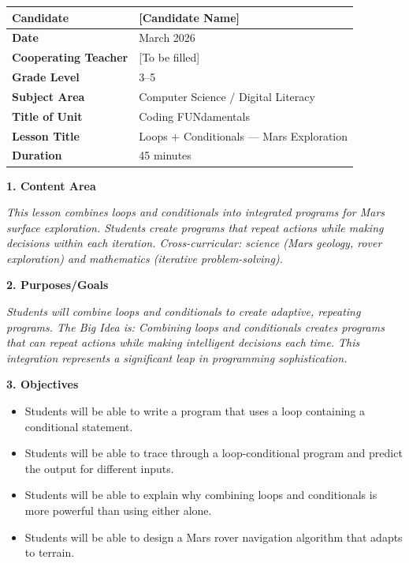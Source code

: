 \documentclass[11pt,letterpaper]{article}
\begin{document}
\begin{longtable}{|L{0.28\textwidth}|L{0.65\textwidth}|}
\hline
\textbf{Candidate}  & [Candidate Name]  \\
\hline
\textbf{Date}  & March 2026  \\
\hline
\textbf{Cooperating Teacher}  & [To be filled]  \\
\hline
\textbf{Grade Level}  & 3--5  \\
\hline
\textbf{Subject Area}  & Computer Science / Digital Literacy  \\
\hline
\textbf{Title of Unit}  & Coding FUNdamentals  \\
\hline
\textbf{Lesson Title}  & Loops + Conditionals --- Mars Exploration  \\
\hline
\textbf{Duration}  & 45 minutes  \\
\hline
\end{longtable}

\textbf{1. Content Area}

\textit{This lesson combines loops and conditionals into integrated programs for Mars surface exploration. Students create programs that repeat actions while making decisions within each iteration. Cross-curricular: science (Mars geology, rover exploration) and mathematics (iterative problem-solving).}

\textbf{2. Purposes/Goals}

\textit{Students will combine loops and conditionals to create adaptive, repeating programs. The Big Idea is: Combining loops and conditionals creates programs that can repeat actions while making intelligent decisions each time. This integration represents a significant leap in programming sophistication.}

\textbf{3. Objectives}

\begin{itemize}
  \item Students will be able to write a program that uses a loop containing a conditional statement.

  \item Students will be able to trace through a loop-conditional program and predict the output for different inputs.

  \item Students will be able to explain why combining loops and conditionals is more powerful than using either alone.

  \item Students will be able to design a Mars rover navigation algorithm that adapts to terrain.
\end{itemize}
\end{document}
